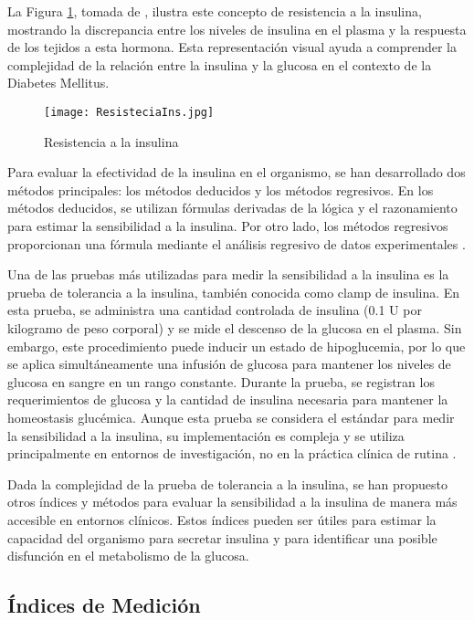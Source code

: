 La Figura \ref{fig:Resistencia}, tomada de \cite{ImgResis}, ilustra este concepto de resistencia a la insulina, mostrando la discrepancia entre los niveles de insulina en el plasma y la respuesta de los tejidos a esta hormona. Esta representación visual ayuda a comprender la complejidad de la relación entre la insulina y la glucosa en el contexto de la Diabetes Mellitus.

\begin{figure}[H]
    \centering
    \texttt{[image: ResisteciaIns.jpg]}
    \caption{Resistencia a la insulina}
    \label{fig:Resistencia}
\end{figure}

Para evaluar la efectividad de la insulina en el organismo, se han desarrollado dos métodos principales: los métodos deducidos y los métodos regresivos. En los métodos deducidos, se utilizan fórmulas derivadas de la lógica y el razonamiento para estimar la sensibilidad a la insulina. Por otro lado, los métodos regresivos proporcionan una fórmula mediante el análisis regresivo de datos experimentales \cite{MedicionEstimacion}.

Una de las pruebas más utilizadas para medir la sensibilidad a la insulina es la prueba de tolerancia a la insulina, también conocida como clamp de insulina. En esta prueba, se administra una cantidad controlada de insulina (0.1 U por kilogramo de peso corporal) y se mide el descenso de la glucosa en el plasma. Sin embargo, este procedimiento puede inducir un estado de hipoglucemia, por lo que se aplica simultáneamente una infusión de glucosa para mantener los niveles de glucosa en sangre en un rango constante. Durante la prueba, se registran los requerimientos de glucosa y la cantidad de insulina necesaria para mantener la homeostasis glucémica. Aunque esta prueba se considera el estándar para medir la sensibilidad a la insulina, su implementación es compleja y se utiliza principalmente en entornos de investigación, no en la práctica clínica de rutina \cite{MedicionEstimacion}.

Dada la complejidad de la prueba de tolerancia a la insulina, se han propuesto otros índices y métodos para evaluar la sensibilidad a la insulina de manera más accesible en entornos clínicos. Estos índices pueden ser útiles para estimar la capacidad del organismo para secretar insulina y para identificar una posible disfunción en el metabolismo de la glucosa.

\subsection{Índices de Medición}


